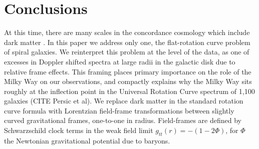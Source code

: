 \documentclass[reprint,%
 amsmath,amssymb,
 aps,
]{revtex4-1}
\begin{document}
 
  

 
 


 



 
 \section{  Conclusions \label{sec:conclu}  }
 

    At this time, there are many scales in   the concordance   cosmology which include  dark matter \cite{2010dmp..book.....S,Tully:2014gfa,Naidu_2022}. 
    In
 this paper we  address only one,  the flat-rotation curve problem of spiral galaxies. 
 We reinterpret this problem at the level of the data, as one of excesses in Doppler shifted spectra
  at large radii in the galactic disk due to relative frame effects. 
   This framing places primary importance on  the role of the Milky Way on our observations,   and compactly explains why the  Milky Way sits roughly at the  inflection  point in  the Universal Rotation Curve spectrum of 1,100 galaxies (CITE Persic et al\cite{Persic}).
   We  
    replace    dark matter in the standard rotation curve formula with Lorentzian field-frame transformations between slightly curved gravitational  frames, one-to-one in radius. 
    Field-frames are defined by Schwarzschild clock terms in the weak field limit $g_{tt}(r)=-(1-2\Phi)$, for $\Phi$ the Newtonian gravitational potential due to baryons.
    
\end{document}
